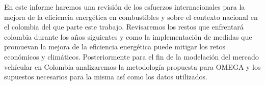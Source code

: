 En este informe haremos una revisión de los esfuerzos internacionales para la mejora de la eficiencia energética en combustibles y sobre el contexto nacional en el colombia del que parte este trabajo. Revisaremos los restos que enfrentará colombia durante los años siguientes y como la implementación de medidas que promuevan la mejora de la eficiencia energética puede mitigar los retos económicos y climáticos. Posteriormente para el fin de la modelación del mercado vehícular en Colombia analizaremos la metodología propuesta para OMEGA y los supuestos necesarios para la misma así como los datos utilizados.



